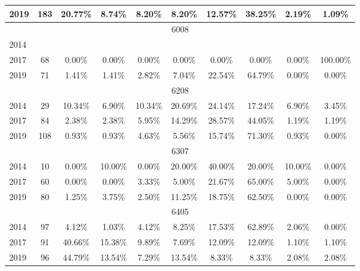 \begin{table}[H]
\begin{tabular}{|l|c|ccc|ccc|cc|}
2019 & 183 & 20.77\% & 8.74\% & 8.20\% & 8.20\% & 12.57\% & 38.25\% & 2.19\% & 1.09\%\\
\hline
\hline
\multicolumn{10}{|c|}{6008}\\
\hline
2014 & & & & & & & & & \\
2017 & 68 & 0.00\% & 0.00\% & 0.00\% & 0.00\% & 0.00\% & 0.00\% & 0.00\% & 100.00\%\\
2019 & 71 & 1.41\% & 1.41\% & 2.82\% & 7.04\% & 22.54\% & 64.79\% & 0.00\% & 0.00\%\\
\hline
\hline
\multicolumn{10}{|c|}{6208}\\
\hline
2014 & 29 & 10.34\% & 6.90\% & 10.34\% & 20.69\% & 24.14\% & 17.24\% & 6.90\% & 3.45\%\\
2017 & 84 & 2.38\% & 2.38\% & 5.95\% & 14.29\% & 28.57\% & 44.05\% & 1.19\% & 1.19\%\\
2019 & 108 & 0.93\% & 0.93\% & 4.63\% & 5.56\% & 15.74\% & 71.30\% & 0.93\% & 0.00\%\\
\hline
\hline
\multicolumn{10}{|c|}{6307}\\
\hline
2014 & 10 & 0.00\% & 10.00\% & 0.00\% & 20.00\% & 40.00\% & 20.00\% & 10.00\% & 0.00\%\\
2017 & 60 & 0.00\% & 0.00\% & 3.33\% & 5.00\% & 21.67\% & 65.00\% & 5.00\% & 0.00\%\\
2019 & 80 & 1.25\% & 3.75\% & 2.50\% & 11.25\% & 18.75\% & 62.50\% & 0.00\% & 0.00\%\\
\hline
\hline
\multicolumn{10}{|c|}{6405}\\
\hline
2014 & 97 & 4.12\% & 1.03\% & 4.12\% & 8.25\% & 17.53\% & 62.89\% & 2.06\% & 0.00\%\\
2017 & 91 & 40.66\% & 15.38\% & 9.89\% & 7.69\% & 12.09\% & 12.09\% & 1.10\% & 1.10\%\\
2019 & 96 & 44.79\% & 13.54\% & 7.29\% & 13.54\% & 8.33\% & 8.33\% & 2.08\% & 2.08\%\\
\hline
\bottomrule
\end{tabular}
\end{table}
